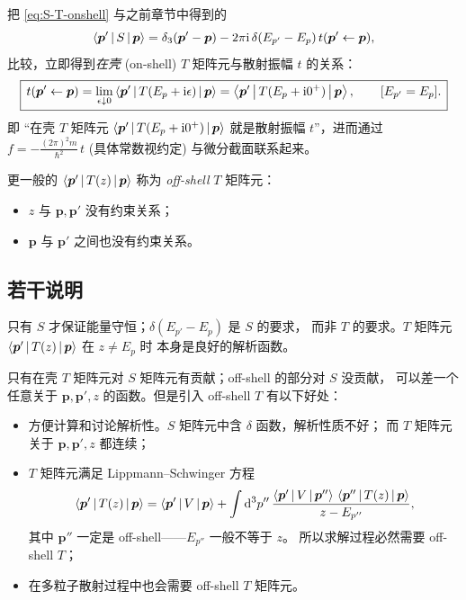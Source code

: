 把 \eqref{eq:S-T-onshell} 与之前章节中得到的
\begin{equation}
  \left\langle \bm p' \,\middle|\, S \,\middle|\, \bm p \right\rangle
  = \delta_3(\bm p'-\bm p)
    - 2\pi\mathrm{i}\,\delta(E_{p'}-E_p)\,t(\bm p'\leftarrow\bm p),
\end{equation}
比较，立即得到\emph{在壳} (on-shell) $T$ 矩阵元与散射振幅 $t$ 的关系：
\begin{equation}\label{eq:T-onshell-t}
  \boxed{\,t(\bm p'\leftarrow\bm p)
    = \lim_{\epsilon\downarrow 0}\left\langle \bm p' \,\middle|\, T(E_p+\mathrm{i}\epsilon) \,\middle|\, \bm p \right\rangle
    = \left\langle \bm p' \,\middle|\, T(E_p+\mathrm{i} 0^+) \,\middle|\, \bm p \right\rangle,\qquad
    [E_{p'}=E_p].\,}
\end{equation}
即 ``在壳 $T$ 矩阵元 $\left\langle \bm p' \,\middle|\, T(E_p+\mathrm{i} 0^+) \,\middle|\, \bm p \right\rangle$
就是散射振幅 $t$''，进而通过 $f=-\frac{(2\pi)^2 m}{\hbar^2}\,t$
(具体常数视约定) 与微分截面联系起来。

更一般的 $\left\langle \bm p' \,\middle|\, T(z) \,\middle|\, \bm p \right\rangle$ 称为 \emph{off-shell} $T$ 矩阵元：
\begin{itemize}
  \item $z$ 与 $\bm p,\bm p'$ 没有约束关系；
  \item $\bm p$ 与 $\bm p'$ 之间也没有约束关系。
\end{itemize}

\subsection{若干说明}

\begin{remark}[关于 $\delta(E_{p'}-E_p)$]
只有 $S$ 才保证能量守恒；$\delta(E_{p'}-E_p)$ 是 $S$ 的要求，
而非 $T$ 的要求。$T$ 矩阵元 $\left\langle \bm p' \,\middle|\, T(z) \,\middle|\, \bm p \right\rangle$ 在 $z\neq E_p$ 时
本身是良好的解析函数。
\end{remark}

\begin{remark}
只有在壳 $T$ 矩阵元对 $S$ 矩阵元有贡献；off-shell 的部分对 $S$ 没贡献，
可以差一个任意关于 $\bm p,\bm p',z$ 的函数。但是引入 off-shell $T$ 有以下好处：
\begin{itemize}
  \item 方便计算和讨论解析性。$S$ 矩阵元中含 $\delta$ 函数，解析性质不好；
        而 $T$ 矩阵元关于 $\bm p,\bm p',z$ 都连续；
  \item $T$ 矩阵元满足 Lippmann--Schwinger 方程
        \begin{equation}\label{eq:T-LS-momentum}
          \left\langle \bm p' \,\middle|\, T(z) \,\middle|\, \bm p \right\rangle
          = \left\langle \bm p' \,\middle|\, V \,\middle|\, \bm p \right\rangle
            + \int\mathrm{d}^3 p''\,
              \frac{\left\langle \bm p' \,\middle|\, V \,\middle|\, \bm p'' \right\rangle\,\left\langle \bm p'' \,\middle|\, T(z) \,\middle|\, \bm p \right\rangle}
                   {z - E_{p''}},
        \end{equation}
        其中 $\bm p''$ 一定是 off-shell——$E_{p''}$ 一般不等于 $z$。
        所以求解过程必然需要 off-shell $T$；
  \item 在多粒子散射过程中也会需要 off-shell $T$ 矩阵元。
\end{itemize}
\end{remark}

